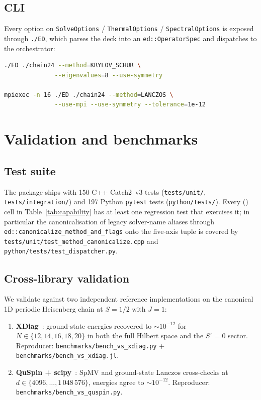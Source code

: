 \documentclass[submission, PhysCodeb]{SciPost}
\begin{document}
\subsection{CLI}
\label{sec:usage-cli}

Every option on \texttt{SolveOptions} / \texttt{ThermalOptions} /
\texttt{SpectralOptions} is exposed through \texttt{./ED}, which
parses the deck into an \texttt{ed::OperatorSpec} and dispatches to
the orchestrator:

\begin{lstlisting}[language=bash]
./ED ./chain24 --method=KRYLOV_SCHUR \
              --eigenvalues=8 --use-symmetry

mpiexec -n 16 ./ED ./chain24 --method=LANCZOS \
              --use-mpi --use-symmetry --tolerance=1e-12
\end{lstlisting}

\section{Validation and benchmarks}
\label{sec:validation}

\subsection{Test suite}
\label{sec:val-tests}
The package ships with 150 C++ Catch2~v3 tests
(\texttt{tests/unit/}, \texttt{tests/integration/}) and 197 Python
\texttt{pytest} tests (\texttt{python/tests/}). Every (\checkmark)
cell in Table~\ref{tab:capability} has at least one regression test
that exercises it; in particular the canonicalisation of legacy
solver-name aliases through \texttt{ed::canonicalize\_method\_and\_flags}
onto the five-axis tuple is covered by
\texttt{tests/unit/test\_method\_canonicalize.cpp} and
\texttt{python/tests/test\_dispatcher.py}.

\subsection{Cross-library validation}
\label{sec:val-cross}
We validate against two independent reference implementations on the
canonical 1D periodic Heisenberg chain at $S=1/2$ with $J=1$:
\begin{enumerate}[leftmargin=2.2em]
\item \textbf{XDiag}~\cite{Wietek2025XDiag}: ground-state energies
recovered to $\sim 10^{-12}$ for $N \in \{12,14,16,18,20\}$ in both
the full Hilbert space and the $S^z=0$ sector. Reproducer:
\texttt{benchmarks/bench\_vs\_xdiag.py} +
\texttt{benchmarks/bench\_vs\_xdiag.jl}.
\item \textbf{QuSpin + scipy}~\cite{Weinberg2017QuSpin,Weinberg2019QuSpin2}:
SpMV and ground-state Lanczos cross-checks at
$d \in \{4096, \dots, 1\,048\,576\}$, energies agree to
$\sim 10^{-12}$.
Reproducer: \texttt{benchmarks/bench\_vs\_quspin.py}.
\end{enumerate}
\end{document}
